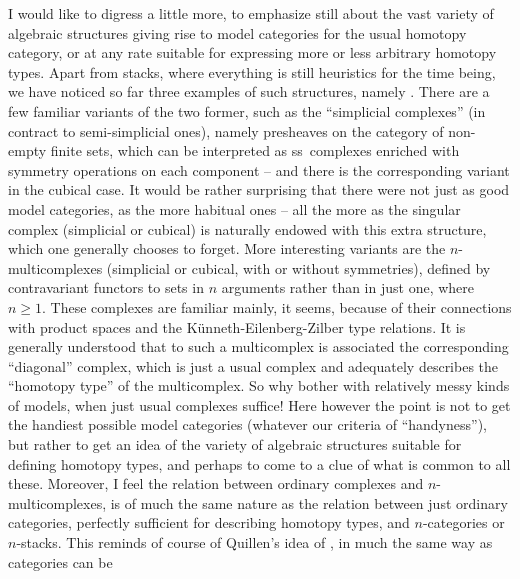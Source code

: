 \label{sec:21}%
I would like to digress a little more, to emphasize still about the
vast variety of algebraic structures giving rise to model categories
for the usual homotopy category, or at any rate suitable for
expressing more or less arbitrary homotopy types. Apart from stacks,
where everything is still heuristics for the time being, we have
noticed so far three examples of such structures, namely
. There are a few familiar variants of the two
former, such as the ``simplicial complexes'' (in contract to
semi-simplicial ones), namely presheaves on the category of non-empty
finite sets, which can be interpreted as ss~complexes enriched with
symmetry operations on each component -- and there is the
corresponding variant in the cubical case. It would be rather
surprising that there were not just as good model categories, as the
more habitual ones -- all the more as the singular complex (simplicial
or cubical) is naturally endowed with this extra structure, which one
generally chooses to forget. More interesting variants are the
$n$-multicomplexes (simplicial or cubical, with or without
symmetries), defined by contravariant functors to sets in $n$
arguments rather than in just one, where $n\ge1$. These complexes are
familiar mainly, it seems, because of their connections with product
spaces and the K\"unneth-Eilenberg-Zilber type relations. It is
generally understood that to such a multicomplex is
associated the corresponding ``diagonal'' complex, which is
just a usual complex and adequately describes the ``homotopy type'' of
the multicomplex. So why bother with relatively messy kinds of models,
when just usual complexes suffice! Here however the point is not to
get the handiest possible model categories (whatever our criteria of
``handyness''), but rather to get an idea of the variety of algebraic
structures suitable for defining homotopy types, and perhaps to come
to a clue of what is common to all these. Moreover, I feel the
relation between ordinary complexes and $n$-multicomplexes, is of much
the same nature as the relation between just ordinary categories,
perfectly sufficient for describing homotopy types, and $n$-categories
or $n$-stacks. This reminds of course of Quillen's idea of
, in much the same way as categories can be
